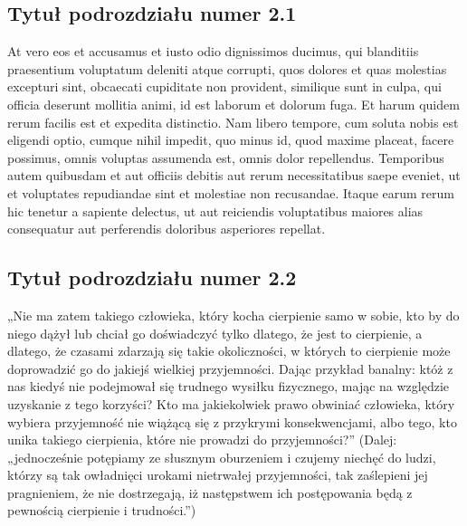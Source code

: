 \documentclass[12pt,a4paper]{article}
\begin{document}
\subsection{Tytuł podrozdziału numer 2.1}
At vero eos et accusamus et iusto odio dignissimos ducimus, qui blanditiis praesentium voluptatum deleniti atque corrupti, quos dolores et quas molestias excepturi sint, obcaecati cupiditate non provident, similique sunt in culpa, qui officia deserunt mollitia animi, id est laborum et dolorum fuga. Et harum quidem rerum facilis est et expedita distinctio. Nam libero tempore, cum soluta nobis est eligendi optio, cumque nihil impedit, quo minus id, quod maxime placeat, facere possimus, omnis voluptas assumenda est, omnis dolor repellendus. Temporibus autem quibusdam et aut officiis debitis aut rerum necessitatibus saepe eveniet, ut et voluptates repudiandae sint et molestiae non recusandae. Itaque earum rerum hic tenetur a sapiente delectus, ut aut reiciendis voluptatibus maiores alias consequatur aut perferendis doloribus asperiores repellat.

\subsection{Tytuł podrozdziału numer 2.2}
„Nie ma zatem takiego człowieka, który kocha cierpienie samo w sobie, kto by do niego dążył lub chciał go doświadczyć tylko dlatego, że jest to cierpienie, a dlatego, że czasami zdarzają się takie okoliczności, w których to cierpienie może doprowadzić go do jakiejś wielkiej przyjemności. Dając przykład banalny: któż z nas kiedyś nie podejmował się trudnego wysiłku fizycznego, mając na względzie uzyskanie z tego korzyści? Kto ma jakiekolwiek prawo obwiniać człowieka, który wybiera przyjemność nie wiążącą się z przykrymi konsekwencjami, albo tego, kto unika takiego cierpienia, które nie prowadzi do przyjemności?” (Dalej: „jednocześnie potępiamy ze słusznym oburzeniem i czujemy niechęć do ludzi, którzy są tak owładnięci urokami nietrwałej przyjemności, tak zaślepieni jej pragnieniem, że nie dostrzegają, iż następstwem ich postępowania będą z pewnością cierpienie i trudności.”)
\end{document}
